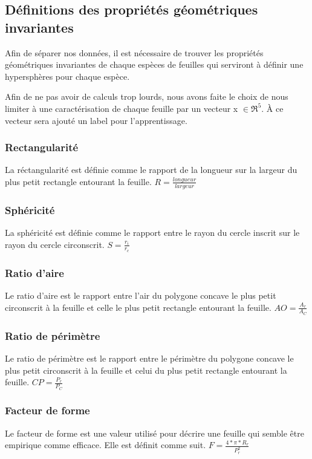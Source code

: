 \subsection{Définitions des propriétés géométriques invariantes}


Afin de séparer nos données, il est nécessaire de trouver les propriétés géométriques invariantes de chaque espèces de feuilles qui serviront à définir une hypersphères pour chaque espèce.

Afin de ne pas avoir de calculs trop lourds, nous avons faite le choix de nous limiter à une caractérisation de chaque feuille par un vecteur x $\in \Re ^{5}$. À ce vecteur sera ajouté un label pour l'apprentissage.

\subsubsection{Rectangularité}
La réctangularité est définie comme le rapport de la longueur sur la largeur du plus petit rectangle entourant la feuille.
\smallbreak
$R=\frac{longueur}{largeur}$
\subsubsection{Sphéricité}
La sphéricité est définie comme le rapport entre le rayon du cercle inscrit sur le rayon du cercle circonscrit.
\smallbreak
$S=\frac{r_{i}}{r_{c}}$
\subsubsection{Ratio d'aire}
Le ratio d'aire est le rapport entre l'air du polygone concave le plus petit circonscrit à la feuille et celle le plus petit rectangle entourant la feuille.
\smallbreak
$AO=\frac{A_{r}}{A_{C}}$
\subsubsection{Ratio de périmètre}
Le ratio de périmètre est le rapport entre le périmètre du polygone concave le plus petit circonscrit à la feuille et celui du plus petit rectangle entourant la feuille.
\smallbreak
$CP=\frac{P_{r}}{P_{C}}$
\subsubsection{Facteur de forme}
Le facteur de forme est une valeur utilisé pour décrire une feuille qui semble être empirique comme efficace. Elle est définit comme suit.
\smallbreak
$F=\frac{4*\pi*R_{r}}{P_{r}^{2}}$